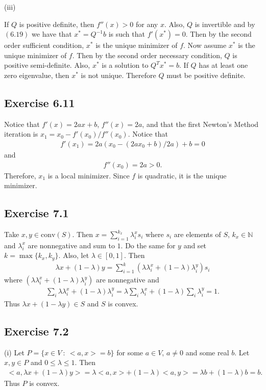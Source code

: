\documentclass[11.5pt, letterpaper, bibtotoc,
    tablecaptionabove, figurecaptionabove]{article}
\begin{document}
(iii)

If $Q$ is positive definite, then $f''(x)>0$ for any $x$.
Also, $Q$ is invertible and by $(6.19)$ we have 
that $x^*=Q^{-1}b$ is such that $f'(x^*)=0$.
Then by the second order sufficient condition, $x^*$ is the unique minimizer of $f$.
Now assume $x^*$ is the unique minimizer of $f$.
Then by the second order necessary condition, $Q$ is positive semi-definite.
Also, $x^*$ is a solution to $Q^Tx^*=b$.
If $Q$ has at least one zero eigenvalue, then $x^*$ is not unique.
Therefore $Q$ must be positive definite.

\subsection*{Exercise 6.11}
Notice that $f'(x)=2ax+b$, $f''(x)=2a$, and that the first Newton's Method iteration is 
$x_1=x_0-f'(x_0)/f''(x_0)$.
Notice that 
\begin{align*}
    f'(x_1)=2a(x_0-(2ax_0+b)/2a)+b=0
\end{align*}
and
\begin{align*}
    f''(x_0)=2a>0.
\end{align*}
Therefore, $x_1$ is a local minimizer.
Since $f$ is quadratic, it is the unique minimizer.

\subsection{Exercise 7.1}
Take $x,y\in\text{conv}(S)$.
Then $x=\sum_{i=1}^{k_x}\lambda^x_is_i$ where $s_i$ are elements of $S$,
$k_x\in\mathbb N$ and $\lambda^x_i$ are nonnegative and sum to $1$.
Do the same for $y$ and set $k=\max\{k_x,k_y\}$.
Also, let $\lambda\in[0,1]$.
Then
\begin{align*}
    \lambda x+(1-\lambda)y = \sum_{i=1}^k(\lambda\lambda^x_i+(1-\lambda)\lambda^y_i)s_i
\end{align*}
where $(\lambda\lambda^x_i+(1-\lambda)\lambda^y_i)$ are nonnegative and
\begin{align*}
    \sum_i\lambda\lambda^x_i+(1-\lambda)\lambda^y_i=
    \lambda\sum_i\lambda^x_i+(1-\lambda)\sum_i\lambda^y_i=1.
\end{align*}
Thus $\lambda x+(1-\lambda y)\in S$ and $S$ is convex.

\subsection*{Exercise 7.2}
(i)
Let $P=\{x\in V\ :\ <a,x>=b\}$ for some $a\in V$, $a\neq 0$ and some real $b$.
Let $x,y\in P$ and $0\leq\lambda\leq 1$.
Then
\begin{align*}
    <a,\lambda x+(1-\lambda)y>=\lambda<a,x>+(1-\lambda)<a,y>=\lambda b + (1-\lambda)b=b.
\end{align*}
Thus $P$ is convex.
\end{document}
